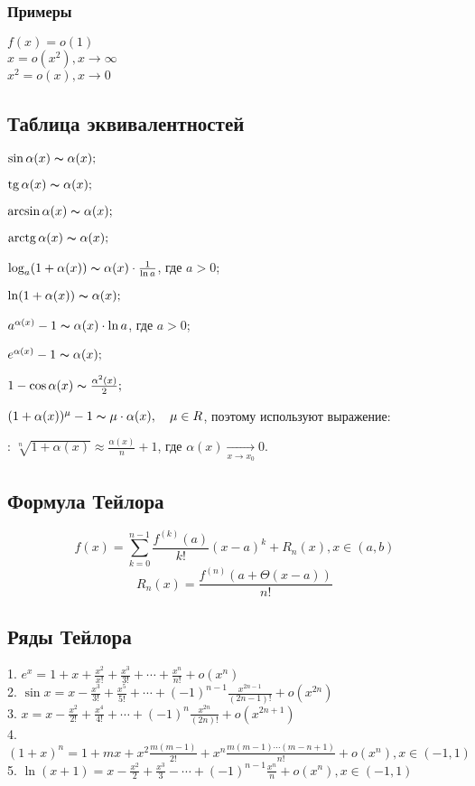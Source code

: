 \subsubsection{Примеры}

$ f(x) = o( 1 ) $ \\
$ x = o( x^2 ), x\to \infty $ \\
$ x^2 = o( x ), x\to 0 $ \\

\subsection{Таблица эквивалентностей}

$\sin\alpha(x)\thicksim\alpha(x);$

$ \operatorname{tg} \alpha(x)\thicksim\alpha(x);$

$\arcsin{\alpha(x)}\thicksim\alpha(x);$

$\mathrm{arctg}\,\alpha(x)\thicksim\alpha(x);$

$\log_a(1+\alpha(x))\thicksim\alpha(x)\cdot\frac{1}{\ln{a}}$, где $a>0$;

$\ln(1+\alpha (x))\thicksim\alpha(x);$

$a^{\alpha(x)}-1\thicksim\alpha(x)\cdot\ln{a}$, где $a>0$;

$e^{\alpha(x)}-1\thicksim\alpha(x);$

$1-\cos{\alpha(x)}\thicksim\frac{\alpha^2(x)}{2};$

$(1+\alpha(x))^\mu-1\thicksim\mu\cdot\alpha(x),\quad\mu\in R$, поэтому используют выражение:

: $\sqrt[n]{1+\alpha(x)}\approx\frac{\alpha(x)}{n}+1$, где $\alpha(x)\xrightarrow[x\to x_0]{}0$.
\subsection{Формула Тейлора}

$$
f(x) = \sum_{k = 0}^{n - 1} \frac{f^{(k)} (a)}{k!} (x - a)^k + R_n(x), x \in (a, b)
$$
$$
R_n(x) = \frac{f^{(n)}(a + \Theta(x - a))}{n!} 
$$

\subsection{Ряды Тейлора}

1. $e^x = 1 + x + \frac{x^2}{x!} + \frac{x^3}{3!} + \cdots + \frac{x^n}{n!} + o(x^n) $ \\
2. $ \sin{x} = x - \frac{x^3}{3!} + \frac{x^5}{5!} + \cdots + (-1)^{n-1}\frac{x^{2n-1}}{(2n-1)!} + o(x^{2n}) $ \\
3. $ x = x - \frac{x^2}{2!} + \frac{x^4}{4!} + \cdots + (-1)^n\frac{x^{2n}}{(2n)!} + o(x^{2n+1}) $ \\
4. $ (1+x)^n = 1 + mx + x^2\frac{m(m-1)}{2!} + x^n\frac{m(m-1)\cdots(m-n+1)}{n!} + o(x^n), x \in (-1,1) $ \\
5. $ \ln(x + 1) = x - \frac{x^2}{2} + \frac{x^3}{3} - \cdots + (-1)^{n-1}\frac{x^n}{n} + o(x^n), x \in (-1,1) $ \\

